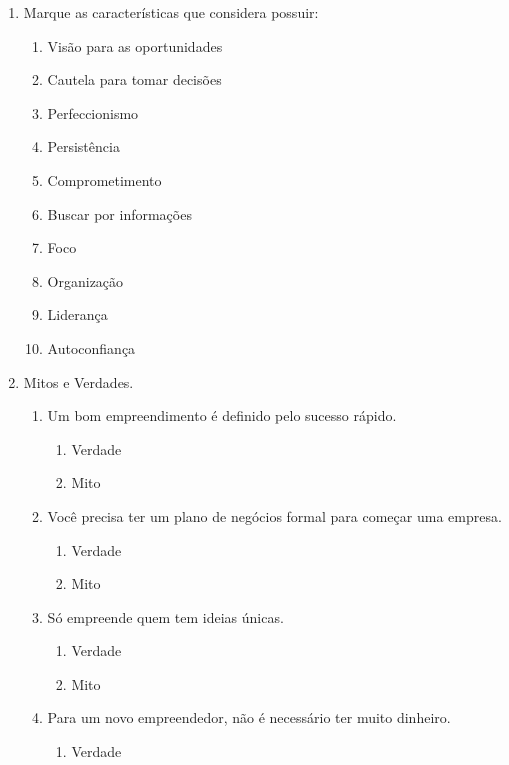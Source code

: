 \begin{enumerate}[noitemsep]
\begin{enumerate}[noitemsep]
    \end{enumerate}
    \item Marque as características que considera possuir:
    \begin{enumerate}[noitemsep]
        \item Visão para as oportunidades
        \item Cautela para tomar decisões
        \item Perfeccionismo
        \item Persistência
        \item Comprometimento
        \item Buscar por informações
        \item Foco
        \item Organização
        \item Liderança
        \item Autoconfiança
    \end{enumerate}
    \item Mitos e Verdades.
        \begin{enumerate}[noitemsep]
            \item Um bom empreendimento é definido pelo sucesso rápido.
            \begin{enumerate}[noitemsep]
                \item Verdade
                \item Mito
            \end{enumerate}
            \item Você precisa ter um plano de negócios formal para começar uma empresa.
            \begin{enumerate}[noitemsep]
                \item Verdade
                \item Mito
            \end{enumerate}
            \item Só empreende quem tem ideias únicas.
            \begin{enumerate}[noitemsep]
                \item Verdade
                \item Mito
            \end{enumerate}
            \item Para um novo empreendedor, não é necessário ter muito dinheiro.
            \begin{enumerate}[noitemsep]
                \item Verdade

\end{enumerate}
\end{enumerate}
\end{enumerate}
